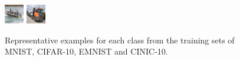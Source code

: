 \begin{figure}[t]
    \includegraphics[width = 0.09 \textwidth]{images/datasets/cinic10_8.png}
    \includegraphics[width = 0.09 \textwidth]{images/datasets/cinic10_9.png}
    \caption{Representative examples for each class from the training sets of MNIST, CIFAR-10, EMNIST and CINIC-10.}
    \label{fig:datasets}
\end{figure}